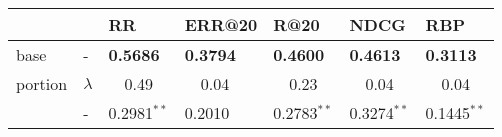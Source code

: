 \begin{tabular}{lllllll}
\toprule
        &   &                RR &            ERR@20 &              R@20 &              NDCG &               RBP \\
\midrule
base & - &            \textbf{0.5686} &            \textbf{0.3794} &            \textbf{0.4600} &            \textbf{0.4613} &            \textbf{0.3113} \\
portion & $\lambda$ &              ~~0.49 &              ~~0.04 &              ~~0.23 &              ~~0.04 &              ~~0.04 \\
        & - &     0.2981$^{**}$ &            0.2010 &     0.2783$^{**}$ &     0.3274$^{**}$ &     0.1445$^{**}$ \\
\bottomrule
\end{tabular}
